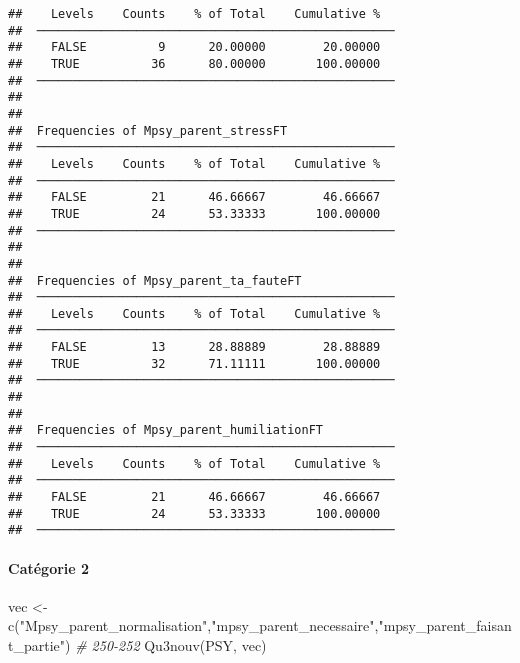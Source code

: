 \documentclass[
]{article}
\newenvironment{Shaded}{\begin{snugshade}}{\end{snugshade}}
\newcommand{\CommentTok}[1]{\textcolor[rgb]{0.56,0.35,0.01}{\textit{#1}}}
\newcommand{\FunctionTok}[1]{\textcolor[rgb]{0.00,0.00,0.00}{#1}}
\newcommand{\NormalTok}[1]{#1}
\newcommand{\OtherTok}[1]{\textcolor[rgb]{0.56,0.35,0.01}{#1}}
\newcommand{\StringTok}[1]{\textcolor[rgb]{0.31,0.60,0.02}{#1}}
\begin{document}
\begin{verbatim}
##    Levels    Counts    % of Total    Cumulative %   
##  ────────────────────────────────────────────────── 
##    FALSE          9      20.00000        20.00000   
##    TRUE          36      80.00000       100.00000   
##  ────────────────────────────────────────────────── 
## 
## 
##  Frequencies of Mpsy_parent_stressFT                
##  ────────────────────────────────────────────────── 
##    Levels    Counts    % of Total    Cumulative %   
##  ────────────────────────────────────────────────── 
##    FALSE         21      46.66667        46.66667   
##    TRUE          24      53.33333       100.00000   
##  ────────────────────────────────────────────────── 
## 
## 
##  Frequencies of Mpsy_parent_ta_fauteFT              
##  ────────────────────────────────────────────────── 
##    Levels    Counts    % of Total    Cumulative %   
##  ────────────────────────────────────────────────── 
##    FALSE         13      28.88889        28.88889   
##    TRUE          32      71.11111       100.00000   
##  ────────────────────────────────────────────────── 
## 
## 
##  Frequencies of Mpsy_parent_humiliationFT           
##  ────────────────────────────────────────────────── 
##    Levels    Counts    % of Total    Cumulative %   
##  ────────────────────────────────────────────────── 
##    FALSE         21      46.66667        46.66667   
##    TRUE          24      53.33333       100.00000   
##  ──────────────────────────────────────────────────
\end{verbatim}

\hypertarget{catuxe9gorie-2-2}{%
\paragraph{Catégorie 2}\label{catuxe9gorie-2-2}}

\begin{Shaded}
\begin{Highlighting}[]
\NormalTok{vec }\OtherTok{\textless{}{-}} \FunctionTok{c}\NormalTok{(}\StringTok{"Mpsy\_parent\_normalisation"}\NormalTok{,}\StringTok{"mpsy\_parent\_necessaire"}\NormalTok{,}\StringTok{"mpsy\_parent\_faisant\_partie"}\NormalTok{)  }\CommentTok{\# 250{-}252}
\FunctionTok{Qu3nouv}\NormalTok{(PSY, vec)}
\end{Highlighting}
\end{Shaded}
\end{document}
